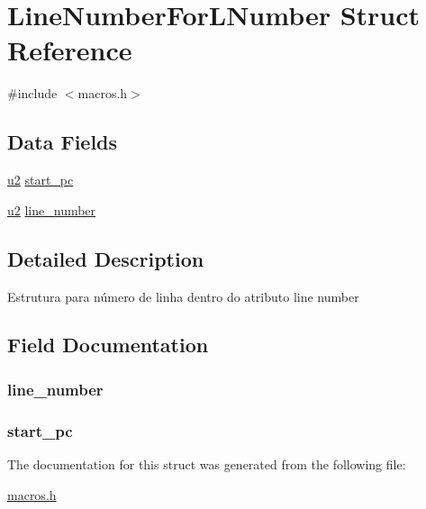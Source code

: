 \hypertarget{struct_line_number_for_l_number}{}\section{Line\+Number\+For\+L\+Number Struct Reference}
\label{struct_line_number_for_l_number}


{\ttfamily \#include $<$macros.\+h$>$}

\subsection*{Data Fields}
\begin{DoxyCompactItemize}
\item 
\hyperlink{macros_8h_a732cde1300aafb73b0ea6c2558a7a54f}{u2} \hyperlink{struct_line_number_for_l_number_a3ded0b47a89e0816c20dc577a82a1cd5}{start\+\_\+pc}
\item 
\hyperlink{macros_8h_a732cde1300aafb73b0ea6c2558a7a54f}{u2} \hyperlink{struct_line_number_for_l_number_a04c031f26dbcf868c823d68ad0771dbc}{line\+\_\+number}
\end{DoxyCompactItemize}


\subsection{Detailed Description}
Estrutura para número de linha dentro do atributo line number 

\subsection{Field Documentation}
\hypertarget{struct_line_number_for_l_number_a04c031f26dbcf868c823d68ad0771dbc}{}
\subsubsection[{line\+\_\+number}]{ line\+\_\+number}\label{struct_line_number_for_l_number_a04c031f26dbcf868c823d68ad0771dbc}
\hypertarget{struct_line_number_for_l_number_a3ded0b47a89e0816c20dc577a82a1cd5}{}
\subsubsection[{start\+\_\+pc}]{ start\+\_\+pc}\label{struct_line_number_for_l_number_a3ded0b47a89e0816c20dc577a82a1cd5}


The documentation for this struct was generated from the following file\+:\begin{DoxyCompactItemize}
\item 
\hyperlink{macros_8h}{macros.\+h}\end{DoxyCompactItemize}
